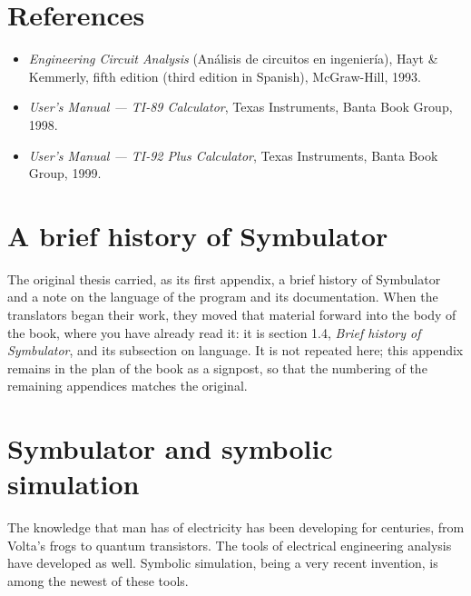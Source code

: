 \chapter*{References}

\begin{itemize}
\item \emph{Engineering Circuit Analysis} (An\'alisis de circuitos
  en ingenier\'ia), Hayt \& Kemmerly, fifth edition (third edition
  in Spanish), McGraw-Hill, 1993.
\item \emph{User's Manual --- TI-89 Calculator}, Texas Instruments,
  Banta Book Group, 1998.
\item \emph{User's Manual --- TI-92 Plus Calculator}, Texas
  Instruments, Banta Book Group, 1999.
\end{itemize}

\appendix

\chapter{A brief history of Symbulator}

The original thesis carried, as its first appendix, a brief history
of Symbulator and a note on the language of the program and its
documentation. When the translators began their work, they moved
that material forward into the body of the book, where you have
already read it: it is section 1.4, \emph{Brief history of
Symbulator}, and its subsection on language. It is not repeated
here; this appendix remains in the plan of the book as a signpost,
so that the numbering of the remaining appendices matches the
original.

\chapter{Symbulator and symbolic simulation}

The knowledge that man has of electricity has been developing for
centuries, from Volta's frogs to quantum transistors. The tools of
electrical engineering analysis have developed as well. Symbolic
simulation, being a very recent invention, is among the newest of
these tools.

